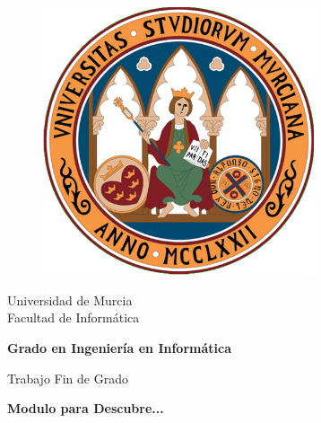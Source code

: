 \begin{titlepage}
	\vspace*{\fill}
	\begin{center}
		\vspace*{-1in}
		\begin{figure}[htb]
			\begin{center}
				\includegraphics[width=8cm]{images/logo.png}
			\end{center}
		\end{figure}
		\vspace*{0.15in}
		Universidad de Murcia\\
		\vspace*{0.15in}
		Facultad de Informática \\
		\vspace*{0.6in}
		\begin{large}
			\textbf{Grado en Ingeniería en Informática}\\
		\end{large}
		\vspace*{0.1in}
		\begin{large}
			Trabajo Fin de Grado\\
		\end{large}
		\vspace*{0.2in}
		\begin{Large}
			\textbf{{\color{red}Modulo para Descubre...}} \\

\end{Large}
\end{center}
\end{titlepage}
